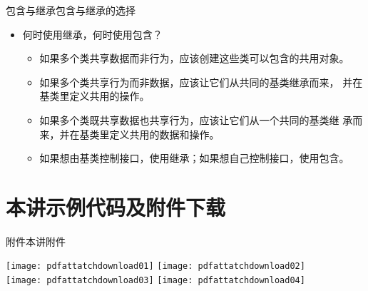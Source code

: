 \begin{frame}[t, fragile]{包含与继承}{包含与继承的选择}%
  \stretchon
  \begin{itemize}  
  \item 何时使用继承，何时使用包含？
    \begin{itemize}
    \item 如果多个类共享数据而非行为，应该创建这些类可以包含的共用对象。
    \item 如果多个类共享行为而非数据，应该让它们从共同的基类继承而来，
      并在基类里定义共用的操作。
    \item 如果多个类既共享数据也共享行为，应该让它们从一个共同的基类继
      承而来，并在基类里定义共用的数据和操作。
    \item 如果想由基类控制接口，使用继承；如果想自己控制接口，使用包含。
    \end{itemize}
  \end{itemize}
  \stretchoff
\end{frame}

\section[附件下载]{本讲示例代码及附件下载} 
\begin{frame}{附件}{本讲附件}

  \vspace{-1ex}
  \begin{center}
    \texttt{[image: pdfattatchdownload01]}\quad
    \texttt{[image: pdfattatchdownload02]}\\[2ex]%
    \texttt{[image: pdfattatchdownload03]}\quad
    \texttt{[image: pdfattatchdownload04]}%
  \end{center}   
\end{frame}




